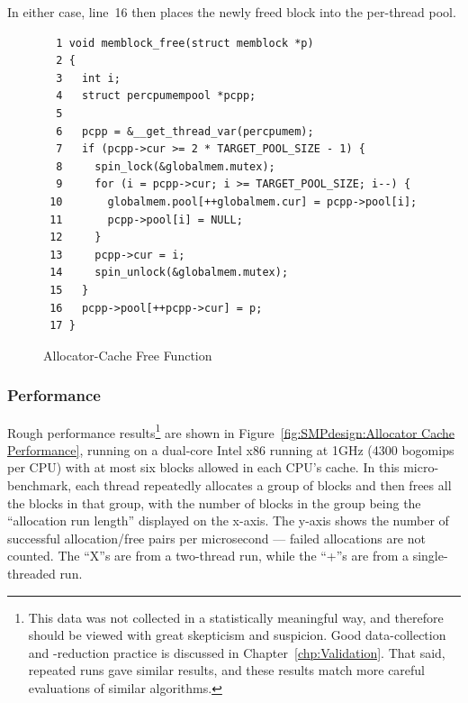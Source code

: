 In either case, line~16 then places the newly freed block into the
per-thread pool.

\begin{figure}[htbp]
{ \scriptsize
\begin{verbatim}
  1 void memblock_free(struct memblock *p)
  2 {
  3   int i;
  4   struct percpumempool *pcpp;
  5
  6   pcpp = &__get_thread_var(percpumem);
  7   if (pcpp->cur >= 2 * TARGET_POOL_SIZE - 1) {
  8     spin_lock(&globalmem.mutex);
  9     for (i = pcpp->cur; i >= TARGET_POOL_SIZE; i--) {
 10       globalmem.pool[++globalmem.cur] = pcpp->pool[i];
 11       pcpp->pool[i] = NULL;
 12     }
 13     pcpp->cur = i;
 14     spin_unlock(&globalmem.mutex);
 15   }
 16   pcpp->pool[++pcpp->cur] = p;
 17 }
\end{verbatim}
}
\caption{Allocator-Cache Free Function}
\label{fig:SMPdesign:Allocator-Cache Free Function}
\end{figure}

\subsubsection{Performance}

Rough performance results\footnote{
	This data was not collected in a statistically meaningful way,
	and therefore should be viewed with great skepticism and suspicion.
	Good data-collection and -reduction practice is discussed
	in Chapter~\ref{chp:Validation}.
	That said, repeated runs gave similar results, and these results
	match more careful evaluations of similar algorithms.}
are shown in
Figure~\ref{fig:SMPdesign:Allocator Cache Performance},
running on a dual-core Intel x86 running at 1GHz (4300 bogomips per CPU)
with at most six blocks allowed in each CPU's cache.
In this micro-benchmark,
each thread repeatedly allocates a group of blocks and then frees all
the blocks in that group, with
the number of blocks in the group being the ``allocation run length''
displayed on the x-axis.
The y-axis shows the number of successful allocation/free pairs per
microsecond --- failed allocations are not counted.
The ``X''s are from a two-thread run, while the ``+''s are from a
single-threaded run.


